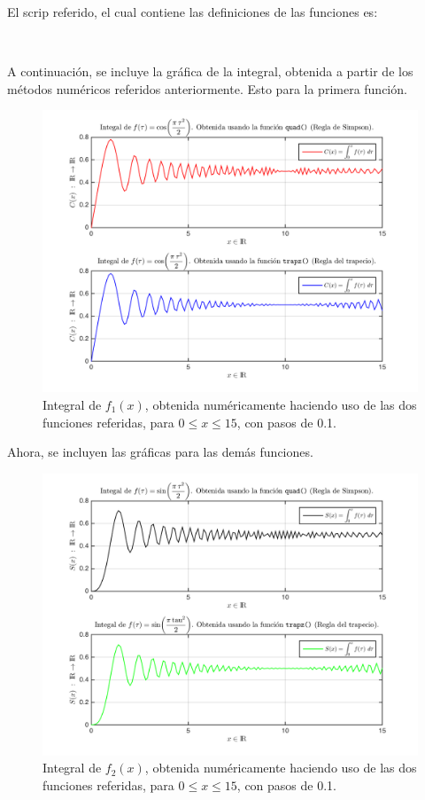 \documentclass[11pt, spanish]{article}
\begin{document}
El scrip referido, el cual contiene las definiciones de las funciones es:

\

A continuación, se incluye la gráfica de la integral, obtenida a partir de los métodos numéricos referidos anteriormente. Esto para la primera función.

\begin{figure}[H]
\centering
	\includegraphics[scale=0.8]{data/img/f1intplot01}
	\caption{Integral de $f_1(x)$, obtenida numéricamente haciendo uso de las dos funciones referidas, para $0 \leq x \leq 15$, con pasos de 0.1.}
\end{figure}

Ahora, se incluyen las gráficas para las demás funciones.

\begin{figure}[H]
\centering
	\includegraphics[scale=0.6]{data/img/f2intplot01}
	\caption{Integral de $f_2(x)$, obtenida numéricamente haciendo uso de las dos funciones referidas, para $0 \leq x \leq 15$, con pasos de 0.1.}
\end{figure}
\end{document}
